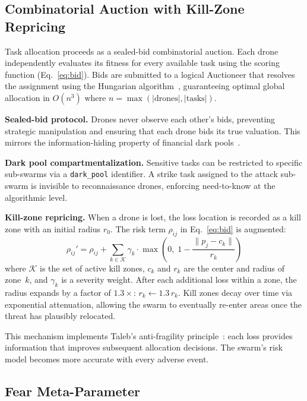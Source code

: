 \documentclass[conference]{IEEEtran}
\begin{document}
\subsection{Combinatorial Auction with Kill-Zone Repricing}
\label{sec:auction}

Task allocation proceeds as a sealed-bid combinatorial auction.  Each
drone independently evaluates its fitness for every available task
using the scoring function (Eq.~\ref{eq:bid}).  Bids are submitted
to a logical Auctioneer that resolves the assignment using the
Hungarian algorithm~\cite{kuhn1955hungarian}, guaranteeing optimal
global allocation in $O(n^3)$ where $n = \max(|\text{drones}|,
|\text{tasks}|)$.

\textbf{Sealed-bid protocol.}\quad
Drones never observe each other's bids, preventing strategic
manipulation and ensuring that each drone bids its true valuation.
This mirrors the information-hiding property of financial dark
pools~\cite{vickrey1961counterspeculation}.

\textbf{Dark pool compartmentalization.}\quad
Sensitive tasks can be restricted to specific sub-swarms via a
\texttt{dark\_pool} identifier.  A strike task assigned to the attack
sub-swarm is invisible to reconnaissance drones, enforcing
need-to-know at the algorithmic level.

\textbf{Kill-zone repricing.}\quad
When a drone is lost, the loss location is recorded as a kill zone
with an initial radius $r_0$.  The risk term $\rho_{ij}$ in
Eq.~\ref{eq:bid} is augmented:
\begin{equation}
\label{eq:killzone}
  \rho_{ij}' = \rho_{ij} + \sum_{k \in \mathcal{K}}
  \gamma_k \cdot \max\!\left(0,\; 1 - \frac{\|p_j - c_k\|}{r_k}\right)
\end{equation}
where $\mathcal{K}$ is the set of active kill zones, $c_k$ and $r_k$
are the center and radius of zone~$k$, and $\gamma_k$ is a severity
weight.  After each additional loss within a zone, the radius expands
by a factor of $1.3\times$: $r_k \leftarrow 1.3\,r_k$.  Kill zones
decay over time via exponential attenuation, allowing the swarm to
eventually re-enter areas once the threat has plausibly relocated.

This mechanism implements Taleb's anti-fragility
principle~\cite{taleb2012antifragile}: each loss provides information
that improves subsequent allocation decisions.  The swarm's risk model
becomes more accurate with every adverse event.

\subsection{Fear Meta-Parameter}
\label{sec:fear}
\end{document}
